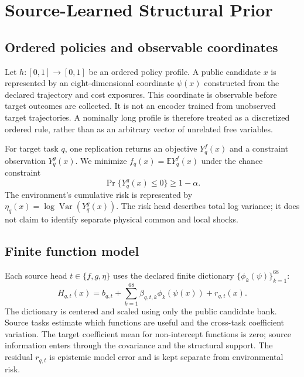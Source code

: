 \section{Source-Learned Structural Prior}\label{sec:mp_model}

\subsection{Ordered policies and observable coordinates}

Let $h:[0,1]\to[0,1]$ be an ordered policy profile.  A public candidate $x$
is represented by an eight-dimensional coordinate $\psi(x)$ constructed from
the declared trajectory and cost exposures.  This coordinate is observable
before target outcomes are collected.  It is not an encoder trained from
unobserved target trajectories.  A nominally long profile is therefore treated
as a discretized ordered rule, rather than as an arbitrary vector of unrelated
free variables.

For target task $q$, one replication returns an objective $Y^f_q(x)$ and a
constraint observation $Y^g_q(x)$.  We minimize $f_q(x)=\mathbb E Y^f_q(x)$
under the chance constraint
\begin{equation}
 \Pr\{Y^g_q(x)\le 0\}\ge 1-\alpha.
 \label{eq:mp_chance}
\end{equation}
The environment's cumulative risk is represented by $\eta_q(x)=\log
\operatorname{Var}(Y^g_q(x))$.  The risk head describes total log variance; it
does not claim to identify separate physical common and local shocks.

\subsection{Finite function model}

Each source head $t\in\{f,g,\eta\}$ uses the declared finite dictionary
$\{\phi_k(\psi)\}_{k=1}^{68}$:
\begin{equation}
 H_{q,t}(x)=b_{q,t}+\sum_{k=1}^{68}\beta_{q,t,k}\phi_k(\psi(x))+r_{q,t}(x).
 \label{eq:mp_head}
\end{equation}
The dictionary is centered and scaled using only the public candidate bank.
Source tasks estimate which functions are useful and the cross-task coefficient
variation.  The target coefficient mean for non-intercept functions is zero;
source information enters through the covariance and the structural support.
The residual $r_{q,t}$ is epistemic model error and is kept separate from
environmental risk.

